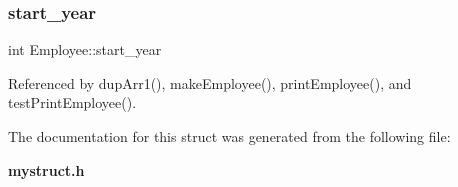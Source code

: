 \subsubsection{start\+\_\+year}
{\footnotesize\ttfamily int Employee\+::start\+\_\+year}



Referenced by dup\+Arr1(), make\+Employee(), print\+Employee(), and test\+Print\+Employee().



The documentation for this struct was generated from the following file\+:\begin{DoxyCompactItemize}
\item 
\textbf{ mystruct.\+h}\end{DoxyCompactItemize}
